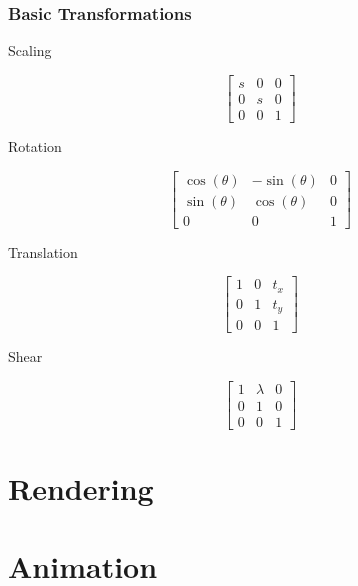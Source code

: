 \documentclass[10pt,landscape]{article}
\begin{document}
\begin{multicols}{3}
\subsubsection{Basic Transformations}

\begin{multicols}{2}

Scaling

$$\begin{bmatrix}
s & 0 & 0 \\
0 & s & 0 \\
0 & 0 & 1
\end{bmatrix}$$

Rotation

$$\begin{bmatrix}
\cos(\theta) & -\sin(\theta) & 0 \\
\sin(\theta) & \cos(\theta) & 0 \\
0 & 0 & 1
\end{bmatrix}$$

\columnbreak

Translation

$$\begin{bmatrix}
1 & 0 & t_x \\
0 & 1 & t_y \\
0 & 0 & 1
\end{bmatrix}$$

Shear

$$\begin{bmatrix}
1 & \lambda & 0 \\
0 & 1 & 0 \\
0 & 0 & 1
\end{bmatrix}$$

\end{multicols}




\section{Rendering}


\section{Animation}



\end{multicols}
\end{document}
